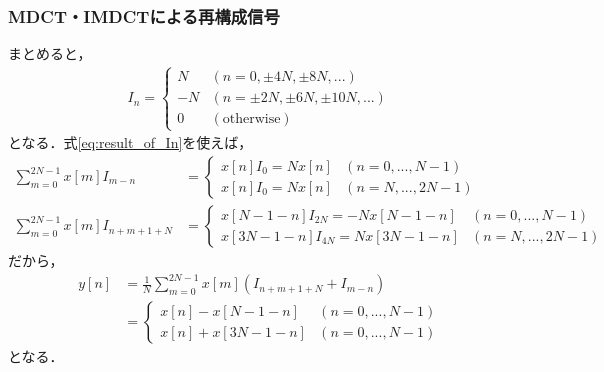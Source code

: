 \documentclass[14pt,xcolor=dvipsnames,table,dvipdfmx]{beamer}
\begin{document}
\begin{frame}[c]
    \frametitle{MDCT・IMDCTによる再構成信号}
    \scriptsize
    まとめると，
    \begin{align}
        I_{n} = \left\{ \begin{array}{ll}
            N & (n = 0, \pm 4N, \pm 8N, ...) \\
            -N & (n = \pm 2N, \pm 6N, \pm 10N, ...) \\
            0 & (\text{otherwise})
        \end{array} \right. \label{eq:result_of_In}
    \end{align}
    となる．式\eqref{eq:result_of_In}を使えば，
    \begin{align*}
        \sum_{m = 0}^{2N - 1} x[m] I_{m - n} &= \left\{ \begin{array}{ll}
            x[n] I_{0} = N x[n] & (n = 0, ..., N - 1) \\
            x[n] I_{0} = N x[n] & (n = N, ..., 2N - 1)
        \end{array} \right. \\
        \sum_{m = 0}^{2N - 1} x[m] I_{n + m + 1 + N} &= \left\{ \begin{array}{ll}
            x[N - 1 - n] I_{2N} = -N x[N - 1 - n] & (n = 0, ..., N - 1) \\
            x[3N - 1 - n] I_{4N} = N x[3N - 1 - n] & (n = N, ..., 2N - 1)
        \end{array} \right.
    \end{align*}
    だから，
    \begin{align*}
        y[n] &= \frac{1}{N} \sum_{m = 0}^{2N - 1} x[m] ( I_{n + m + 1 + N} + I_{m - n} ) \\
        &= \left\{ \begin{array}{ll}
            x[n] - x[N - 1 - n] & (n = 0, ..., N - 1) \\
            x[n] + x[3N - 1 - n] & (n = 0, ..., N - 1)
        \end{array} \right.
    \end{align*}
    となる．
\end{frame}
\end{document}
